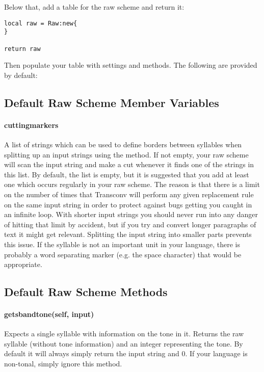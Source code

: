 \documentclass{ltxdockit}
\begin{document}
Below that, add a table for the raw scheme and return it:

\begin{lstlisting}
local raw = Raw:new{
}

return raw
\end{lstlisting}

Then populate your table with settings and methods. The following are provided
by default:

\subsection{Default Raw Scheme Member Variables}

\paragraph{cutting\textunderscore{}markers}

A list of strings which can be used to define borders between syllables when
splitting up an input strings using the  method.
If not empty, your raw scheme will scan the input string and make a cut whenever
it finds one of the strings in this list. By default, the list is empty, but it
is suggested that you add at least one which occurs regularly in your raw
scheme. The reason is that there is a limit on the number of times that
Transconv will perform any given replacement rule on the same input string in
order to protect against bugs getting you caught in an infinite loop. With
shorter input strings you should never run into any danger of hitting that limit
by accident, but if you try and convert longer paragraphs of text it might get
relevant. Splitting the input string into smaller parts prevents this issue. If
the syllable is not an important unit in your language, there is probably a word
separating marker (e.g. the space character) that would be appropriate.

\subsection{Default Raw Scheme Methods}

\paragraph{get\textunderscore{}sb\textunderscore{}and\textunderscore{}tone(self, input)}

Expects a single syllable with information on the tone in it. Returns the raw
syllable (without tone information) and an integer representing the tone. By
default it will always simply return the input string and 0. If your language is
non-tonal, simply ignore this method.
\end{document}
